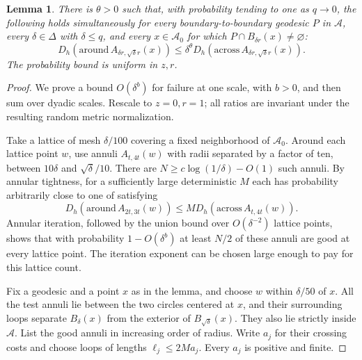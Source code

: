 \documentclass[11pt]{article}
\newtheorem{lemma}[theorem]{Lemma}
\theoremstyle{definition}
\theoremstyle{remark}
\begin{document}
\begin{lemma}\label{lem:loop-ratio}
There is $\theta>0$ such that, with probability tending to one
as $q\to0$, the following holds simultaneously for every
boundary-to-boundary geodesic $P$ in $\mathcal A$, every
$\delta\in\Delta$ with $\delta\le q$, and every
$x\in\mathcal A_0$ for which $P\cap B_{\delta r}(x)\ne\varnothing$:
\begin{equation}\label{eq:loop-ratio}
 D_h(\mathrm{around}\,A_{\delta r,\sqrt\delta r}(x))
       \le\delta^\theta
          D_h(\mathrm{across}\,A_{\delta r,\sqrt\delta r}(x)).
\end{equation}
The probability bound is uniform in $z,r$.
\end{lemma}
\begin{proof}
We prove a bound $O(\delta^b)$ for failure at one scale, with
$b>0$, and then sum over dyadic scales. Rescale to $z=0,r=1$;
all ratios are invariant under the resulting random metric
normalization.

Take a lattice of mesh $\delta/100$ covering a fixed neighborhood
of $\mathcal A_0$. Around each lattice point $w$, use annuli
$A_{t,4t}(w)$ with radii separated by a factor of ten, between
$10\delta$ and $\sqrt\delta/10$. There are
$N\ge c\log(1/\delta)-O(1)$ such annuli. By annular tightness,
for a sufficiently large deterministic $M$ each has probability
arbitrarily close to one of satisfying
\begin{equation}\label{eq:one-shell}
 D_h(\mathrm{around}\,A_{2t,3t}(w))
             \le M D_h(\mathrm{across}\,A_{t,4t}(w)).
\end{equation}
Annular iteration, followed by the union bound over
$O(\delta^{-2})$ lattice points, shows that with probability
$1-O(\delta^b)$ at least $N/2$ of these annuli are good at
every lattice point. The iteration exponent can be chosen large
enough to pay for this lattice count.

Fix a geodesic and a point $x$ as in the lemma, and choose
$w$ within $\delta/50$ of $x$. All the test annuli lie between
the two circles centered at $x$, and their surrounding loops
separate $B_\delta(x)$ from the exterior of $B_{\sqrt\delta}(x)$.
They also lie strictly inside $\mathcal A$. List the good
annuli in increasing order of radius. Write $a_j$ for their
crossing costs and choose loops of lengths
$\ell_j\le2M a_j$. Every $a_j$ is positive and finite.


\end{proof}
\end{document}
